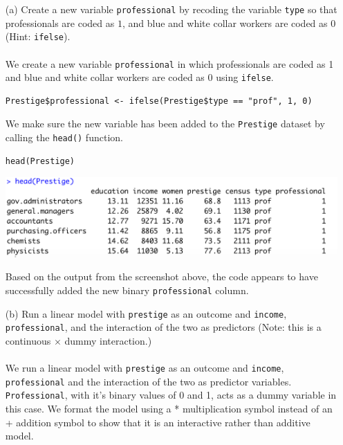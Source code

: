 \documentclass[12pt,letterpaper]{article}
\begin{document}
\newpage
\begin{enumerate}
	
	\item [(a)]
	Create a new variable \texttt{professional} by recoding the variable \texttt{type} so that professionals are coded as $1$, and blue and white collar workers are coded as $0$ (Hint: \texttt{ifelse}).
	\\\\
	\noindent We create a new variable \texttt{professional} in which professionals are coded as 1 and blue and white collar workers are coded as 0 using \texttt{ifelse}.
	\begin{lstlisting}
Prestige$professional <- ifelse(Prestige$type == "prof", 1, 0)
	\end{lstlisting}

\noindent We make sure the new variable has been added to the \texttt{Prestige} dataset by calling the \texttt{head()} function.
\begin{lstlisting}
head(Prestige)
\end{lstlisting}

\includegraphics[width=\textwidth]{head(Prestige).png}	

\noindent Based on the output from the screenshot above, the code appears to have successfully added the new binary \texttt{professional} column.	
	
	\vspace{6cm}
	
\newpage	
	\item [(b)]
	Run a linear model with \texttt{prestige} as an outcome and \texttt{income}, \texttt{professional}, and the interaction of the two as predictors (Note: this is a continuous $\times$ dummy interaction.)
\\\\
\noindent We run a linear model with \texttt{prestige} as an outcome and \texttt{income}, \texttt{professional} and the interaction of the two as predictor variables. \texttt{Professional}, with it's binary values of 0 and 1, acts as a dummy variable in this case. We format the model using a * multiplication symbol instead of an + addition symbol to show that it is an interactive rather than additive model.


\end{enumerate}
\end{document}
